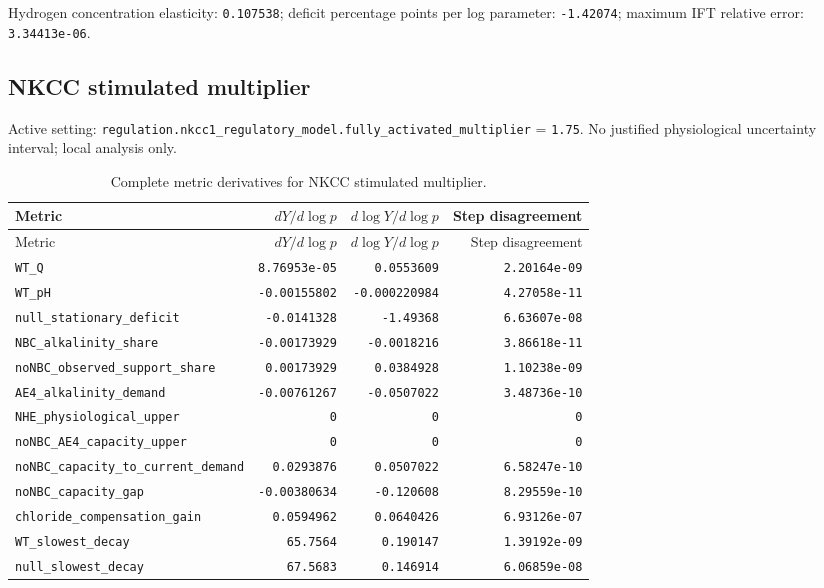 Hydrogen concentration elasticity: \texttt{0.107538}; deficit percentage points per log parameter: \texttt{-1.42074}; maximum IFT relative error: \texttt{3.34413e-06}.\par

\subsection*{NKCC stimulated multiplier}
Active setting: \nolinkurl{regulation.nkcc1_regulatory_model.fully_activated_multiplier} = \texttt{1.75}. No justified physiological uncertainty interval; local analysis only.


\begingroup\scriptsize
\setlength{\tabcolsep}{3pt}
\begin{longtable}{p{.44\linewidth}rrr}
\caption{Complete metric derivatives for NKCC stimulated multiplier.}\\
\toprule
Metric & $dY/d\log p$ & $d\log Y/d\log p$ & Step disagreement \\
\midrule\endfirsthead
\toprule
Metric & $dY/d\log p$ & $d\log Y/d\log p$ & Step disagreement \\
\midrule\endhead
\bottomrule\endfoot
\nolinkurl{WT_Q} & \texttt{8.76953e-05} & \texttt{0.0553609} & \texttt{2.20164e-09} \\
\nolinkurl{WT_pH} & \texttt{-0.00155802} & \texttt{-0.000220984} & \texttt{4.27058e-11} \\
\nolinkurl{null_stationary_deficit} & \texttt{-0.0141328} & \texttt{-1.49368} & \texttt{6.63607e-08} \\
\nolinkurl{NBC_alkalinity_share} & \texttt{-0.00173929} & \texttt{-0.0018216} & \texttt{3.86618e-11} \\
\nolinkurl{noNBC_observed_support_share} & \texttt{0.00173929} & \texttt{0.0384928} & \texttt{1.10238e-09} \\
\nolinkurl{AE4_alkalinity_demand} & \texttt{-0.00761267} & \texttt{-0.0507022} & \texttt{3.48736e-10} \\
\nolinkurl{NHE_physiological_upper} & \texttt{0} & \texttt{0} & \texttt{0} \\
\nolinkurl{noNBC_AE4_capacity_upper} & \texttt{0} & \texttt{0} & \texttt{0} \\
\nolinkurl{noNBC_capacity_to_current_demand} & \texttt{0.0293876} & \texttt{0.0507022} & \texttt{6.58247e-10} \\
\nolinkurl{noNBC_capacity_gap} & \texttt{-0.00380634} & \texttt{-0.120608} & \texttt{8.29559e-10} \\
\nolinkurl{chloride_compensation_gain} & \texttt{0.0594962} & \texttt{0.0640426} & \texttt{6.93126e-07} \\
\nolinkurl{WT_slowest_decay} & \texttt{65.7564} & \texttt{0.190147} & \texttt{1.39192e-09} \\
\nolinkurl{null_slowest_decay} & \texttt{67.5683} & \texttt{0.146914} & \texttt{6.06859e-08} \\
\end{longtable}
\endgroup

